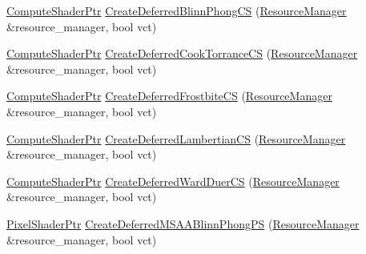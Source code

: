 \begin{DoxyCompactItemize}
\item 
\mbox{\hyperlink{namespacemage_1_1rendering_ab3dc9f2114f2e9255b91d9c051da52ea}{Compute\+Shader\+Ptr}} \mbox{\hyperlink{namespacemage_1_1rendering_1_1anonymous__namespace_02shader__factory__deferred_8cpp_03_ac5adb06d03d8eaedce14d99601702fe7}{Create\+Deferred\+Blinn\+Phong\+CS}} (\mbox{\hyperlink{classmage_1_1rendering_1_1_resource_manager}{Resource\+Manager}} \&resource\+\_\+manager, bool vct)
\item 
\mbox{\hyperlink{namespacemage_1_1rendering_ab3dc9f2114f2e9255b91d9c051da52ea}{Compute\+Shader\+Ptr}} \mbox{\hyperlink{namespacemage_1_1rendering_1_1anonymous__namespace_02shader__factory__deferred_8cpp_03_a2bd61203935ebc99d11f396914189d91}{Create\+Deferred\+Cook\+Torrance\+CS}} (\mbox{\hyperlink{classmage_1_1rendering_1_1_resource_manager}{Resource\+Manager}} \&resource\+\_\+manager, bool vct)
\item 
\mbox{\hyperlink{namespacemage_1_1rendering_ab3dc9f2114f2e9255b91d9c051da52ea}{Compute\+Shader\+Ptr}} \mbox{\hyperlink{namespacemage_1_1rendering_1_1anonymous__namespace_02shader__factory__deferred_8cpp_03_a52db8ec13dd426a7ee8cfd959990271c}{Create\+Deferred\+Frostbite\+CS}} (\mbox{\hyperlink{classmage_1_1rendering_1_1_resource_manager}{Resource\+Manager}} \&resource\+\_\+manager, bool vct)
\item 
\mbox{\hyperlink{namespacemage_1_1rendering_ab3dc9f2114f2e9255b91d9c051da52ea}{Compute\+Shader\+Ptr}} \mbox{\hyperlink{namespacemage_1_1rendering_1_1anonymous__namespace_02shader__factory__deferred_8cpp_03_a0ee99c5705465b819bfc92c623d4e09f}{Create\+Deferred\+Lambertian\+CS}} (\mbox{\hyperlink{classmage_1_1rendering_1_1_resource_manager}{Resource\+Manager}} \&resource\+\_\+manager, bool vct)
\item 
\mbox{\hyperlink{namespacemage_1_1rendering_ab3dc9f2114f2e9255b91d9c051da52ea}{Compute\+Shader\+Ptr}} \mbox{\hyperlink{namespacemage_1_1rendering_1_1anonymous__namespace_02shader__factory__deferred_8cpp_03_a17d9e52148aab78abf0ccff3c276d8bc}{Create\+Deferred\+Ward\+Duer\+CS}} (\mbox{\hyperlink{classmage_1_1rendering_1_1_resource_manager}{Resource\+Manager}} \&resource\+\_\+manager, bool vct)
\item 
\mbox{\hyperlink{namespacemage_1_1rendering_af03d922b228ee9c8542baaa2ecc9f259}{Pixel\+Shader\+Ptr}} \mbox{\hyperlink{namespacemage_1_1rendering_1_1anonymous__namespace_02shader__factory__deferred_8cpp_03_aeb2ee591f6ee093a67c2d0b2449e43cc}{Create\+Deferred\+M\+S\+A\+A\+Blinn\+Phong\+PS}} (\mbox{\hyperlink{classmage_1_1rendering_1_1_resource_manager}{Resource\+Manager}} \&resource\+\_\+manager, bool vct)

\end{DoxyCompactItemize}
